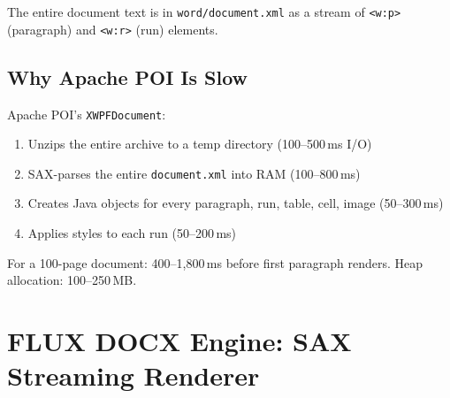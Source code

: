 \documentclass[11pt, a4paper, openright]{report}
\begin{document}
The entire document text is in \texttt{word/document.xml} as a stream of \texttt{<w:p>} (paragraph) and \texttt{<w:r>} (run) elements.

\subsection{Why Apache POI Is Slow}

Apache POI's \texttt{XWPFDocument}:
\begin{enumerate}
  \item Unzips the entire archive to a temp directory (100--500\,ms I/O)
  \item SAX-parses the entire \texttt{document.xml} into RAM (100--800\,ms)
  \item Creates Java objects for every paragraph, run, table, cell, image (50--300\,ms)
  \item Applies styles to each run (50--200\,ms)
\end{enumerate}

For a 100-page document: 400--1,800\,ms before first paragraph renders. Heap allocation: 100--250\,MB.

\section{FLUX DOCX Engine: SAX Streaming Renderer}
\end{document}
